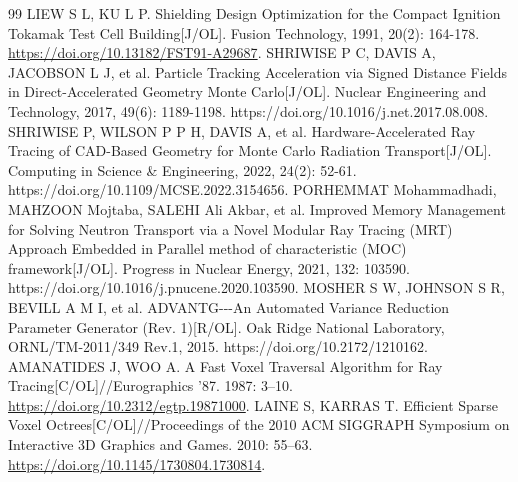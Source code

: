 \documentclass[UTF8, zihao=-4, fontset=none, a4paper]{ctexart}
\begin{document}
\begin{thebibliography}{99}
 LIEW S L, KU L P. Shielding Design Optimization for the Compact Ignition Tokamak Test Cell Building{[}J/OL{]}. Fusion Technology, 1991, 20(2): 164-178. \url{https://doi.org/10.13182/FST91-A29687}.
 SHRIWISE P C, DAVIS A, JACOBSON L J, et al. Particle Tracking Acceleration via Signed Distance Fields in Direct-Accelerated Geometry Monte Carlo{[}J/OL{]}. Nuclear Engineering and Technology, 2017, 49(6): 1189-1198. https://doi.org/10.1016/j.net.2017.08.008.
 SHRIWISE P, WILSON P P H, DAVIS A, et al. Hardware-Accelerated Ray Tracing of CAD-Based Geometry for Monte Carlo Radiation Transport{[}J/OL{]}. Computing in Science \& Engineering, 2022, 24(2): 52-61. https://doi.org/10.1109/MCSE.2022.3154656.
 PORHEMMAT Mohammadhadi, MAHZOON Mojtaba, SALEHI Ali Akbar, et al. Improved Memory Management for Solving Neutron Transport via a Novel Modular Ray Tracing (MRT) Approach Embedded in Parallel method of characteristic (MOC) framework{[}J/OL{]}. Progress in Nuclear Energy, 2021, 132: 103590. https://doi.org/10.1016/j.pnucene.2020.103590.
 MOSHER S W, JOHNSON S R, BEVILL A M I, et al. ADVANTG-\/-\/-An Automated Variance Reduction Parameter Generator (Rev. 1){[}R/OL{]}. Oak Ridge National Laboratory, ORNL/TM-2011/349 Rev.1, 2015. https://doi.org/10.2172/1210162.
 AMANATIDES J, WOO A. A Fast Voxel Traversal Algorithm for Ray Tracing{[}C/OL{]}//Eurographics '87. 1987: 3--10. \url{https://doi.org/10.2312/egtp.19871000}.
 LAINE S, KARRAS T. Efficient Sparse Voxel Octrees{[}C/OL{]}//Proceedings of the 2010 ACM SIGGRAPH Symposium on Interactive 3D Graphics and Games. 2010: 55--63. \url{https://doi.org/10.1145/1730804.1730814}.

\end{thebibliography}
\end{document}
